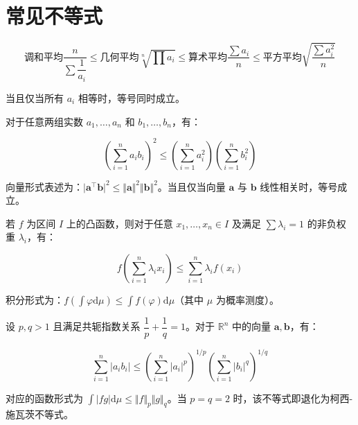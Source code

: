 \section{常见不等式}

\begin{theorem}[均值不等式]

$$
\displaystyle \text{调和平均}\dfrac{n}{\displaystyle\sum \dfrac{1}{a_i}} \le \text{几何平均}\sqrt[n]{\prod a_i} \le \text{算术平均}\dfrac{\displaystyle\sum a_i}{n} \le \text{平方平均}\sqrt{\dfrac{\displaystyle\sum a_i^2}{n}}
$$

当且仅当所有 $\displaystyle a_i$ 相等时，等号同时成立。

\end{theorem}

\begin{theorem}

对于任意两组实数 $\displaystyle a_1, \dots, a_n$ 和 $\displaystyle b_1, \dots, b_n$，有：

$$
\displaystyle \left( \sum_{i=1}^n a_i b_i \right)^2 \le \left( \sum_{i=1}^n a_i^2 \right) \left( \sum_{i=1}^n b_i^2 \right)
$$

向量形式表述为：$\displaystyle \vert \boldsymbol{a}^\top \boldsymbol{b} \vert^2 \le \Vert \boldsymbol{a} \Vert^2 \Vert \boldsymbol{b} \Vert^2$。当且仅当向量 $\displaystyle \boldsymbol{a}$ 与 $\displaystyle \boldsymbol{b}$ 线性相关时，等号成立。

\end{theorem}

\begin{theorem}

若 $\displaystyle f$ 为区间 $\displaystyle I$ 上的凸函数，则对于任意 $\displaystyle x_1, \dots, x_n \in I$ 及满足 $\displaystyle \sum {\lambda}_i = 1$ 的非负权重 $\displaystyle {\lambda}_i$，有：

$$
\displaystyle f\left( \sum_{i=1}^n {\lambda}_i x_i \right) \le \sum_{i=1}^n {\lambda}_i f(x_i)
$$

积分形式为：$\displaystyle f\left( \int {\varphi} \mathrm{d}{\mu} \right) \le \int f({\varphi}) \mathrm{d}{\mu}$（其中 $\displaystyle {\mu}$ 为概率测度）。

\end{theorem}

\begin{theorem}

设 $\displaystyle p, q > 1$ 且满足共轭指数关系 $\displaystyle \dfrac{1}{p} + \dfrac{1}{q} = 1$。对于 $\displaystyle \mathbb{R}^n$ 中的向量 $\boldsymbol{a}, \boldsymbol{b}$，有：

$$
\displaystyle \sum_{i=1}^n \vert a_i b_i \vert \le \left( \sum_{i=1}^n \vert a_i \vert^p \right)^{1/p} \left( \sum_{i=1}^n \vert b_i \vert^q \right)^{1/q}
$$

对应的函数形式为 $\displaystyle \int \vert f g \vert \mathrm{d}{\mu} \le \Vert f \Vert_p \Vert g \Vert_q$。当 $\displaystyle p=q=2$ 时，该不等式即退化为柯西-施瓦茨不等式。

\end{theorem}

